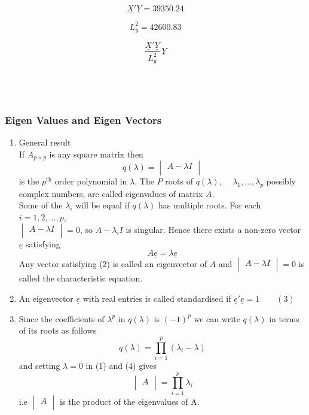 \documentclass[11pt,a4paper]{article}
\theoremstyle{definition}
\begin{document}
$$\underline{X}'\underline{Y} = 39350.24$$

$$L^2_y = 42600.83$$

$$\frac{\underline{X}'\underline{Y}}{L^2_y}\,\underline{Y}$$\\\\\\








\subsubsection{Eigen Values and Eigen Vectors}
\begin{enumerate}
\item General result\\
If $A_{p\times p}$ is any square matrix then $$q(\lambda) = 
\begin{vmatrix}
A - \lambda I\\
\end{vmatrix}$$ is the $p^{\text{th}}$ order polynomial in $\lambda$. The $P$ roots of $q(\lambda)$, $\quad  \lambda_1,\ldots, \lambda_p$ possibly complex numbers, are called eigenvalues of matrix $A$.\\
Some of the $\lambda_i$ will be equal if $q(\lambda)$ has multiple roots. For each $i=1,2,\ldots, p$,\\
$\begin{vmatrix}
A - \lambda I\\
\end{vmatrix} = 0$, so $A - \lambda_i I$ is singular. Hence there exists a non-zero vector $\underline{e}$ satisfying \begin{equation}\tag{2}
A\underline{e} = \lambda \underline{e}
\end{equation} Any vector satisfying (2) is called an eigenvector of $A$ and $\begin{vmatrix}
A - \lambda I\\
\end{vmatrix} =  0$ is called the characteristic equation.

\item An eigenvector $\underline{e}$ with real entries is called standardised if $\underline{e}'\underline{e} = 1\qquad (3)$

\item Since the coefficients of $\lambda^p$ in $q(\lambda)$ is $(-1)^p$ we can write $q(\lambda)$ in terms of its roots as follows \begin{equation}\tag{4}
q(\lambda) = \prod^p_{i=1} (\lambda_i - \lambda)
\end{equation} and setting $\lambda = 0$ in (1) and (4) gives \begin{equation}\tag{5}
\begin{vmatrix}
A\\
\end{vmatrix}= \prod^p_{i=1} \lambda_i
\end{equation} i.e $\begin{vmatrix}
A\\
\end{vmatrix}$ is the product of the eigenvalues of A.


\end{enumerate}
\end{document}

